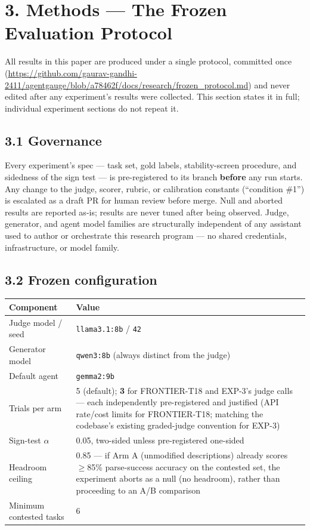 \hypertarget{methods-the-frozen-evaluation-protocol}{%
\section{3. Methods --- The Frozen Evaluation
Protocol}\label{methods-the-frozen-evaluation-protocol}}

All results in this paper are produced under a single protocol,
committed once
(\url{https://github.com/gaurav-gandhi-2411/agentgauge/blob/a78462f/docs/research/frozen_protocol.md})
and never
edited after any experiment's results were collected. This section
states it in full; individual experiment sections do not repeat it.

\hypertarget{governance}{%
\subsection{3.1 Governance}\label{governance}}

Every experiment's spec --- task set, gold labels, stability-screen
procedure, and sidedness of the sign test --- is pre-registered to its
branch \textbf{before} any run starts. Any change to the judge, scorer,
rubric, or calibration constants (``condition \#1'') is escalated as a
draft PR for human review before merge. Null and aborted results are
reported as-is; results are never tuned after being observed.
Judge, generator, and agent model families are structurally independent
of any assistant used to author or orchestrate this research
program --- no shared credentials, infrastructure, or model family.

\hypertarget{frozen-configuration}{%
\subsection{3.2 Frozen configuration}\label{frozen-configuration}}

\renewcommand{\arraystretch}{1.15}
\begin{longtable}{@{}p{}p{}@{}}
\toprule
\textbf{Component} & \textbf{Value} \\
\midrule
\endhead
Judge model / seed & \texttt{llama3.1:8b} / \texttt{42} \\
Generator model & \texttt{qwen3:8b} (always distinct from the judge) \\
Default agent & \texttt{gemma2:9b} \\
Trials per arm & 5 (default); \textbf{3} for FRONTIER-T18 and EXP-3's
judge calls --- each independently pre-registered and justified (API
rate/cost limits for FRONTIER-T18; matching the codebase's existing
graded-judge convention for EXP-3) \\
Sign-test $\alpha$ & 0.05, two-sided unless pre-registered one-sided \\
Headroom ceiling & 0.85 --- if Arm A (unmodified descriptions) already
scores $\geq$85\% parse-success accuracy on the contested set, the experiment
aborts as a null (no headroom), rather than proceeding to an A/B
comparison \\
Minimum contested tasks & 6 \\
\bottomrule
\end{longtable}
\renewcommand{\arraystretch}{1}

